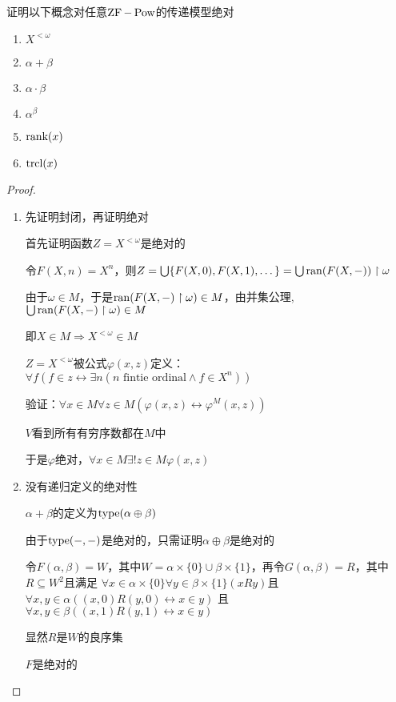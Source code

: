 \documentclass[11pt]{article}
\begin{document}
\begin{exercise}[7.10.8]
证明以下概念对任意\(\operatorname{ZF}-\operatorname{Pow}\)的传递模型绝对
\begin{enumerate}
\item \(X^{<\omega}\)
\item \(\alpha+\beta\)
\item \(\alpha\cdot\beta\)
\item \(\alpha^\beta\)
\item \(\text{rank}(x)\)
\item \(\operatorname{\text{trcl}}(x)\)
\end{enumerate}
\end{exercise}

\begin{proof}
\begin{enumerate}
\item 先证明封闭，再证明绝对

首先证明函数\(Z=X^{<\omega}\)是绝对的

令\(F(X,n)=X^n\)，则\(Z=\bigcup\{F(X,0),F(X,1),\dots\}=\bigcup\operatorname{ran}(F(X,-))\upharpoonright\omega\)

由于\(\omega\in M\)，于是\(\operatorname{ran}(F(X,-)\upharpoonright\omega)\in M\)，由并集公理,\(\bigcup\operatorname{ran}(F(X,-)\upharpoonright\omega)\in M\)

即\(X\in M\Rightarrow X^{<\omega}\in M\)

\(Z=X^{<\omega}\)被公式\(\varphi(x,z)\)定义：\(\forall f(f\in z\leftrightarrow\exists n(n\text{ fintie ordinal}\wedge f\in X^n))\)

验证：\(\forall x\in M\forall z\in M(\varphi(x,z)\leftrightarrow\varphi^M(x,z))\)

\(V\)看到所有有穷序数都在\(M\)中

于是\(\varphi\)绝对，\(\forall x\in M\exists!z\in M\varphi(x,z)\)

\item 没有递归定义的绝对性

\(\alpha+\beta\)的定义为\(\operatorname{type}(\alpha\oplus\beta)\)

由于\(\operatorname{type}(-,-)\)是绝对的，只需证明\(\alpha\oplus\beta\)是绝对的

令\(F(\alpha,\beta)=W\)，其中\(W=\alpha\times\{0\}\cup\beta\times\{1\}\)，再令\(G(\alpha,\beta)=R\)，其中\(R\subseteq W^2\)且满足
\(\forall x\in\alpha\times\{0\}\forall y\in\beta\times\{1\}(xRy)\)且\(\forall x,y\in\alpha((x,0)R(y,0)\leftrightarrow x\in y)\)
且\(\forall x,y\in\beta((x,1)R(y,1)\leftrightarrow x\in y)\)

显然\(R\)是\(W\)的良序集

\(F\)是绝对的


\end{enumerate}
\end{proof}
\end{document}
